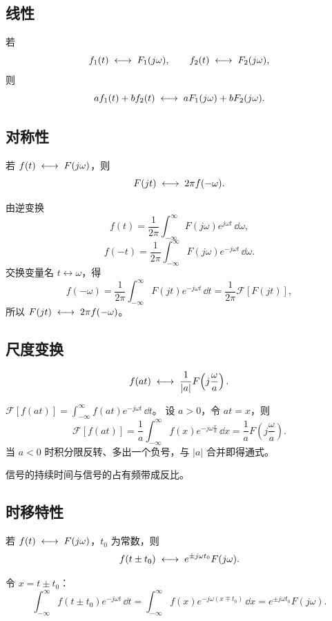 \subsection{线性}

若
\[
    f_1(t)\;\longleftrightarrow\; F_1(j\omega),\qquad f_2(t)\;\longleftrightarrow\; F_2(j\omega),
\]
则
\[
    af_1(t)+bf_2(t)\;\longleftrightarrow\; aF_1(j\omega)+bF_2(j\omega).
\]

\subsection{对称性}

若 $f(t)\;\longleftrightarrow\; F(j\omega)$，则
\[
    F(jt)\;\longleftrightarrow\; 2\pi f(-\omega).
\]

\begin{note}
\quad 由逆变换
\[
    f(t)=\frac{1}{2\pi}\int_{-\infty}^{\infty}F(j\omega)e^{j\omega t}\,\dd\omega,
\]
\[
    f(-t)=\frac{1}{2\pi}\int_{-\infty}^{\infty}F(j\omega)e^{-j\omega t}\,\dd\omega .
\]
交换变量名 $t\leftrightarrow\omega$，得
\[
    f(-\omega)=\frac{1}{2\pi}\int_{-\infty}^{\infty}F(jt)e^{-j\omega t}\,\dd t
    =\frac{1}{2\pi}\mathcal{F}[F(jt)],
\]
所以 $F(jt)\;\longleftrightarrow\; 2\pi f(-\omega)$。
\end{note}

\subsection{尺度变换}

\[
    f(at)\;\longleftrightarrow\; \frac{1}{|a|}F\!\left(j\frac{\omega}{a}\right).
\]

\begin{note}
\quad
$\mathcal{F}[f(at)]=\displaystyle\int_{-\infty}^{\infty}f(at)e^{-j\omega t}\,\dd t$。
设 $a>0$，令 $at=x$，则
\[
    \mathcal{F}[f(at)]=\frac{1}{a}\int_{-\infty}^{\infty}f(x)e^{-j\omega\frac{x}{a}}\,\dd x
    =\frac{1}{a}F\!\left(j\frac{\omega}{a}\right).
\]
当 $a<0$ 时积分限反转、多出一个负号，与 $|a|$ 合并即得通式。
\end{note}

信号的持续时间与信号的占有频带成反比。

\subsection{时移特性}

若 $f(t)\;\longleftrightarrow\; F(j\omega)$，$t_0$ 为常数，则
\[
    f(t\pm t_0)\;\longleftrightarrow\; e^{\pm j\omega t_0}F(j\omega).
\]

\begin{note}
\quad 令 $x=t\pm t_0$：
\[
    \int_{-\infty}^{\infty}f(t\pm t_0)e^{-j\omega t}\,\dd t
    =\int_{-\infty}^{\infty}f(x)e^{-j\omega(x\mp t_0)}\,\dd x
    =e^{\pm j\omega t_0}F(j\omega).
\]
\end{note}

